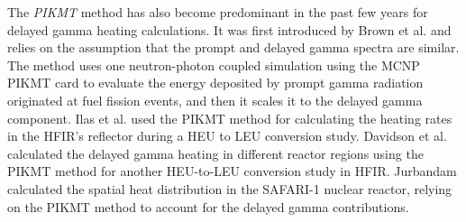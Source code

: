 \documentclass{style/nseJournal}
\begin{document}

The \textit{PIKMT} method has also become predominant in the past few years for delayed gamma heating calculations.
It was first introduced by Brown et al. \cite{brown_monte_2008} and relies on the assumption that the prompt and delayed gamma spectra are similar.
The method uses one neutron-photon coupled simulation using the MCNP PIKMT card to evaluate the energy deposited by prompt gamma radiation originated at fuel fission events, and then it scales it to the delayed gamma component.
Ilas et al. \cite{ilas_impact_2013} used the PIKMT method for calculating the heating rates in the \gls*{HFIR}’s reflector during a \gls*{HEU} to \gls*{LEU} conversion study.
Davidson et al. \cite{davidson_heat_2017} calculated the delayed gamma heating in different reactor regions using the PIKMT method for another HEU-to-LEU conversion study in HFIR.
Jurbandam \cite{jurbandam_calculation_2018} calculated the spatial heat distribution in the SAFARI-1 nuclear reactor, relying on the PIKMT method to account for the delayed gamma contributions.
\end{document}
